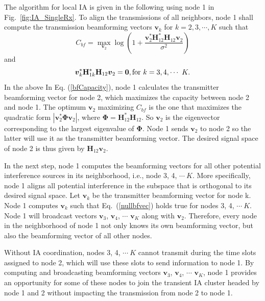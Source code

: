 \documentclass[letterpaper,11pt]{article}
\begin{document}
The algorithm for local IA is given in the following using node 1 in Fig.~\ref{fig:IA_SingleRx}. To align the transmissions of all neighbors, node 1 shall compute the transmission beamforming vectors ${\boldsymbol{v}}_k$ for $k=2, 3, \cdots, K$ such that
\begin{equation}\label{bfCapacity}
C_{bf}=\displaystyle\max_{{\boldsymbol{v}}_2}\log\left(1+\frac{\boldsymbol{v}_2^{*}\mathbf{H}_{12}^{*}\mathbf{H}_{12}\boldsymbol{v}_2}{\sigma^2}\right)
\end{equation}
and
\begin{equation}\label{nullbfvec}
\boldsymbol{v}_k^{*}\mathbf{H}_{1k}^{*}\mathbf{H}_{12}\boldsymbol{v}_2=\mathbf{0}, {\rm{for}}~k=3,4,\cdots~K.
\end{equation}
In the above In Eq. (\ref{bfCapacity}), node 1 calculates the transmitter beamforming vector for node 2, which maximizes the capacity between node 2 and node 1. The optimum $\boldsymbol{v}_2$ maximizing $C_{bf}$ is the one that maximizes the quadratic form $|\boldsymbol{v}_2^*\boldsymbol{\Phi}\boldsymbol{v}_2|$, where $\boldsymbol{\Phi}=\mathbf{H}_{12}^{*}\mathbf{H}_{12}$. So $\boldsymbol{v}_2$ is the eigenvector corresponding to the largest eigenvalue of $\boldsymbol{\Phi}$. Node 1 sends $\boldsymbol{v}_2$ to node 2 so the latter will use it as the transmitter beamforming vector. The desired signal space of node 2 is thus given by $\mathbf{H}_{12}\boldsymbol{v}_2$. 

In the next step, node 1 computes the beamforming vectors for all other potential interference sources in its neighborhood, i.e., node 3, 4, $\cdots~K$. More specifically, node 1 aligns all potential interference in the subspace that is orthogonal to its desired signal space. Let $\boldsymbol{v}_k$ be the transmitter beamforming vector for node k. Node 1 computes $\boldsymbol{v}_k$ such that Eq.~(\ref{nullbfvec}) holds true for nodes 3, 4, $\cdots~K$. Node 1 will broadcast vectors $\boldsymbol{v}_3$, $\boldsymbol{v}_4$, $\cdots$ $\boldsymbol{v}_K$ along with $\boldsymbol{v}_2$. Therefore, every node in the neighborhood of node 1 not only knows its own beamforming vector, but also the beamforming vector of all other nodes.

Without IA coordination, nodes 3, 4, $\cdots~K$ cannot transmit during the time slots assigned to node 2, which will use these slots to send information to node 1. By computing and broadcasting beamforming vectors $\boldsymbol{v}_3$, $\boldsymbol{v}_4$, $\cdots$ $\boldsymbol{v}_K$, node 1 provides an opportunity for some of these nodes to join the transient IA cluster headed by node 1 and 2 without impacting the transmission from node 2 to node 1. 
\end{document}
